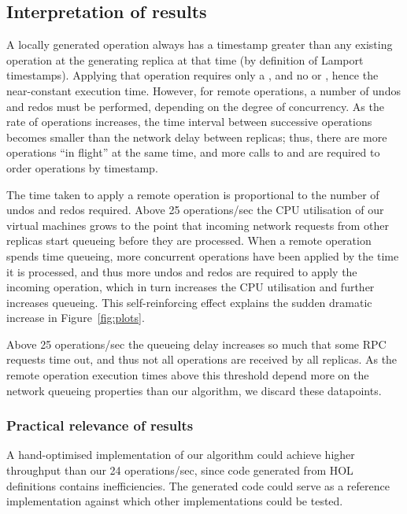 \documentclass[sigplan,anonymous]{acmart}
\begin{document}
\subsection{Interpretation of results}

A locally generated operation always has a timestamp greater than any existing operation at the generating replica at that time (by definition of Lamport timestamps).
Applying that operation requires only a , and no  or , hence the near-constant execution time.
However, for remote operations, a number of undos and redos must be performed, depending on the degree of concurrency.
As the rate of operations increases, the time interval between successive operations becomes smaller than the network delay between replicas; thus, there are more operations ``in flight'' at the same time, and more calls to  and  are required to order operations by timestamp.

The time taken to apply a remote operation is proportional to the number of undos and redos required.
Above 25 operations/sec the CPU utilisation of our virtual machines grows to the point that incoming network requests from other replicas start queueing before they are processed.
When a remote operation spends time queueing, more concurrent operations have been applied by the time it is processed, and thus more undos and redos are required to apply the incoming operation, which in turn increases the CPU utilisation and further increases queueing.
This self-reinforcing effect explains the sudden dramatic increase in Figure~\ref{fig:plots}.

Above 25 operations/sec the queueing delay increases so much that some RPC requests time out, and thus not all operations are received by all replicas.
As the remote operation execution times above this threshold depend more on the network queueing properties than our algorithm, we discard these datapoints.

\subsubsection{Practical relevance of results}

A hand-optimised implementation of our algorithm could achieve higher throughput than our 24 operations/sec, since code generated from HOL definitions contains inefficiencies.
The generated code could serve as a reference implementation against which other implementations could be tested.
\end{document}
